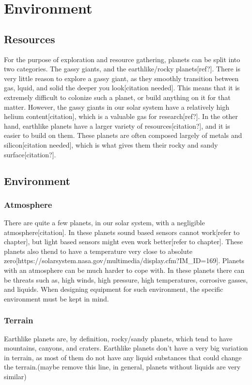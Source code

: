 \clearpage
\section{Environment}
\subsection{Resources}
For the purpose of exploration and resource gathering, planets can be split into two categories. The gassy giants, and the earthlike/rocky planets[ref?].
There is very little reason to explore a gassy giant, as they smoothly transition between gas, lquid, and solid the deeper you look[citation needed]. This means that it is extremely difficult to colonize such a planet, or build anything on it for that matter. However, the gassy giants in our solar system have a relatively high helium content[citation], which is a valuable gas for research[ref?]. 
In the other hand, earthlike planets have a larger variety of resources[citation?], and it is easier to build on them. These planets are often composed largely of metals and silicon[citation needed], which is what gives them their rocky and sandy surface[citation?].


\subsection{Environment}
\subsubsection{Atmosphere}
There are quite a few planets, in our solar system, with a negligible atmosphere[citation]. In these planets sound based sensors cannot work[refer to chapter], but light based sensors might even work better[refer to chapter]. These planets also thend to have a temperature very close to absolute zero[https://solarsystem.nasa.gov/multimedia/display.cfm?IM_ID=169].
Planets with an atmosphere can be much harder to cope with. In these planets there can be threats such as, high winds, high pressure, high temperatures, corrosive gasses, and liquids. When designing equipment for such environment, the specific environment must be kept in mind.

\subsubsection{Terrain}
Earthlike planets are, by definition, rocky/sandy planets, which tend to have mountains, canyons, and craters.
Earthlike planets don't have a very big variation in terrain, as most of them do not have any liquid substances that could change the terrain.(maybe remove this line, in general, planets without liquids are very similar)


